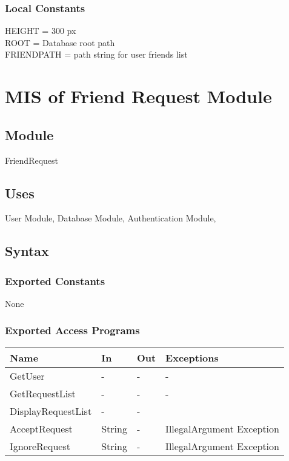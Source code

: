 \documentclass[12pt, titlepage]{article}
\begin{document}
\subsubsection{Local Constants}
HEIGHT = 300 px\\
ROOT = Database root path\\
FRIENDPATH = path string for user friends list

\newpage

\section{MIS of Friend Request Module} \label{mFR}

\subsection{Module}

FriendRequest

\subsection{Uses}

User Module, Database Module, Authentication Module,

\subsection{Syntax}

\subsubsection{Exported Constants}
None

\subsubsection{Exported Access Programs}
\begin{center}
\begin{tabular}{p{4cm} p{2cm} p{4cm} p{4cm}}
\hline
\textbf{Name} & \textbf{In} & \textbf{Out} & \textbf{Exceptions} \\
\hline
GetUser & - & - & - \\
GetRequestList & - & - & - \\
DisplayRequestList & - & -\\
AcceptRequest & String & - & IllegalArgument Exception \\
IgnoreRequest & String & - & IllegalArgument Exception\\
\hline
\end{tabular}
\end{center}
\end{document}
